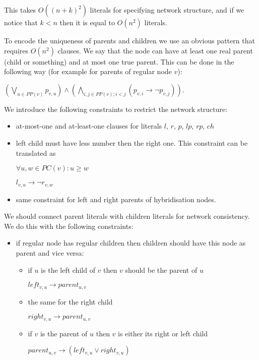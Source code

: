\documentclass[runningheads, envcountsame, a4paper]{llncs}
\begin{document}
This takes $O((n + k)^2)$ literals for specifying network structure, and if we notice that $k < n$ then it is equal 
to $O(n^2)$ literals.

To encode the uniqueness of parents and children we use an obvious pattern that requires $O(n^2)$ clauses. We say 
that the node can have at least one real parent (child or something) and at most one true parent. This can be done 
in the following way (for example for parents of regular node $v$):

$(\bigvee\limits_{u \in PP(v)} p_{v,u}) \wedge (\bigwedge\limits_{i, j \in PP(v);i < j} (p_{v,i} \rightarrow \neg p_{v,j}))$.

We introduce the following constraints to restrict the network structure:

\begin{itemize}

\item at-most-one and at-least-one clauses for literals $l$, $r$, $p$, $lp$, $rp$, $ch$

\item left child must have less number then the right one. This constraint can be translated as 
      
      $\forall u, w \in PC(v): u \geq w$

      $l_{v,u} \rightarrow \neg r_{v,w}$
      
\item same constraint for left and right parents of hybridisation nodes.

\end{itemize}

We should connect parent literals with children literals for network consistency. We do this with the following constraints:

\begin{itemize}

\item if regular node has regular children then children should have this node as parent and vice versa:
    \begin{itemize}
    \item if $u$ is the left child of $v$ then $v$ should be the parent of $u$
    
    $left_{v,u} \rightarrow parent_{u,v}$
    \item the same for the right child
    
    $right_{v,u} \rightarrow parent_{u,v}$ 
    \item if $v$ is the parent of $u$ then $v$ is either its right or left child
    
    $parent_{u,v} \rightarrow (left_{v,u} \vee right_{v,u})$
    \end{itemize}

\end{itemize}
\end{document}
